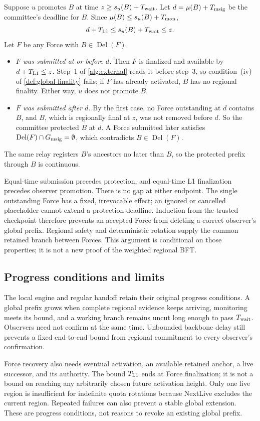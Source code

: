\documentclass[11pt,a4paper]{article}
\newif\ifrevmarks
\newcommand{\Rv}[1]{\ifrevmarks\leavevmode{\color{rvBlue}#1}\else#1\fi}
\newcommand{\Del}{\operatorname{Del}}
\newcommand{\Twait}{T_{\rm wait}}
\begin{document}
\Rv{Suppose $u$ promotes $B$ at time $z\ge s_u(B)+\Twait$. Let
$d=\mu(B)+T_{\rm msig}$ be the committee's deadline for $B$. Since
$\mu(B)\le s_u(B)+T_{\rm mon}$,}
\[
 \Rv{d+T_{\rm L1}\le s_u(B)+\Twait\le z.}
\]
\Rv{Let $F$ be any Force with $B\in\Del(F)$.}
\begin{itemize}
\item \Rv{\emph{$F$ was submitted at or before $d$.} Then $F$ is
finalized and available by $d+T_{\rm L1}\le z$. Step~1 of
\cref{alg:external} reads it before step~3, so condition~(iv) of
\cref{def:global-finality} fails; if $F$ has already activated, $B$ has
no regional finality. Either way, $u$ does not promote $B$.}
\item \Rv{\emph{$F$ was submitted after $d$.} By the first case, no Force
outstanding at $d$ contains $B$, and $B$, which is regionally final at
$z$, was not removed before $d$. So the committee protected $B$ at $d$.
A Force submitted later satisfies $\Del(F)\cap G_{\rm msig}=\emptyset$,
which contradicts $B\in\Del(F)$.}
\end{itemize}
\Rv{The same relay registers $B$'s ancestors no later than $B$, so the
protected prefix through $B$ is continuous.}

Equal-time submission precedes protection, and equal-time L1
finalization precedes observer promotion. There is no gap at either
endpoint. The single outstanding Force has a fixed, irrevocable effect;
an ignored or cancelled placeholder cannot extend a protection deadline.
Induction from the trusted checkpoint therefore prevents an accepted
Force from deleting a correct observer's global prefix. Regional safety
and deterministic rotation supply the common retained branch between
Forces. This argument is conditional on those properties; it is not a
new proof of the weighted regional BFT.

\subsection{Progress conditions and limits}
The local engine and regular handoff retain their original progress
conditions. A global prefix grows when complete regional evidence keeps
arriving, monitoring meets its bound, and a working branch remains
uncut long enough to pass \Rv{$\Twait$}. Observers need not confirm at the same
time. Unbounded backbone delay still prevents a fixed end-to-end bound
from regional commitment to every observer's confirmation.

Force recovery also needs eventual activation, an available retained
anchor, a live successor, and its authority. The bound $T_{\rm L1}$ ends
at Force finalization; it is not a bound on reaching any arbitrarily
chosen future activation height. Only one live region is insufficient
for indefinite quota rotations because NextLive excludes the current
region. Repeated failures can also prevent a stable global extension.
These are progress conditions, not reasons to revoke an existing global
prefix.
\end{document}

